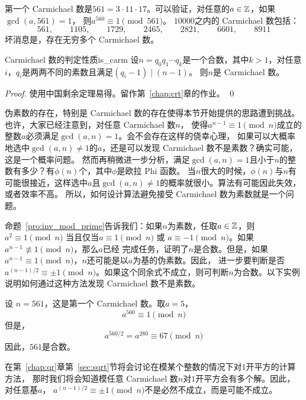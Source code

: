 \begin{example}
第一个 Carmichael 数是$561 = 3 \cdot 11 \cdot 17$。可以验证，对任意的$a\in {\mathbb Z}$，如果$\gcd(a, 561) =1$，
则$a^{560} \equiv 1 \pmod{561}$。
$10000$之内的 Carmichael 数包括：
\[561, \qquad 1105, \qquad 1729, \qquad 2465, \qquad 2821, \qquad6601, \qquad8911\]
坏消息是，存在无穷多个 Carmichael 数。

\end{example}

\begin{theorem}{Carmichael 数的判定性质}{is_carm}
设$n = q_0 q_1 \cdots q_k$是一个合数，其中$k > 1$，对任意$i$，$q_i$是两两不同的素数且满足$(q_i - 1) \mid (n - 1)$。
则$n$是 Carmichael 数。
\end{theorem}

\begin{proof}
使用中国剩余定理易得。留作第~\ref{chap:crt}章的作业。 \qed
\end{proof}

伪素数的存在，特别是 Carmichael 数的存在使得本节开始提供的思路遭到挑战。
也许，大家已经注意到，对任意 Carmichael 数$n$，
使得$a^{n-1} \equiv 1 \pmod{n}$成立的整数$a$必须满足$\gcd(a,n)=1$。会不会存在这样的侥幸心理，
如果可以大概率地选中$\gcd(a,n) \neq 1$的$a$，还是可以发现 Carmichael 数不是素数？确实可能，这是一个概率问题。
然而再稍微进一步分析，满足$\gcd(a,n)=1$且小于$n$的整数有多少？有$\phi(n)$个，其中$\phi$是欧拉 Phi 函数。
当$n$很大的时候，$\phi(n)$与$n$有可能很接近，这样选中$a$且$\gcd(a,n) \neq 1$的概率就很小。算法有可能因此失效，或者效率不高。
所以，如何设计算法避免接受 Carmichael 数为素数就是一个问题。

命题~\ref{pro:inv_mod_prime}告诉我们：如果$n$为素数，任取$a\in {\mathbb Z}$，则$a^2 \equiv 1 \pmod{n}$ 
当且仅当$a \equiv 1 \pmod{n}$ 或 $a \equiv -1 \pmod{n}$。如果$a^{n-1} \not\equiv 1 \pmod{n}$，那么$a$已经
完成任务，证明了$n$是合数。但是，如果$a^{n-1} \equiv 1 \pmod{n}$，$n$还可能是以$a$为基的伪素数。因此，
进一步要判断是否$a^{(n-1)/2} \equiv \pm 1 \pmod{n}$。如果这个同余式不成立，则可判断$n$为合数。以下实例说明如何通过这种方法发现 Carmichael 数不是素数。%

\begin{example}
设 $n = 561$，这是第一个 Carmichael 数。取$a= 5$，
\[a^{560} \equiv 1 \pmod{n}\]
但是，
\[a^{560/2} = a^{280} \equiv 67 \pmod{n}\]
因此，$561$是合数。
\end{example}

\begin{remark}
	在第~\ref{chap:qr}章第~\ref{sec:sqrt}节将会讨论在模某个整数的情况下对$1$开平方的计算方法，
	那时我们将会知道模任意 Carmichael 数$n$对$1$开平方会有多个解。因此，对任意基$a$，
	$a^{(n-1)/2} \equiv \pm 1 \pmod{n}$不是必然不成立，而是可能不成立。
\end{remark}

